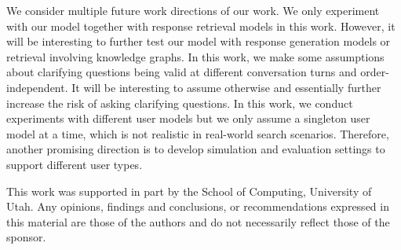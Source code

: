 \documentclass[format=acmsmall, review=False, screen=true]{acmart}
\begin{document}
We consider multiple future work directions of our work. We only experiment with our model together with response retrieval models in this work. However, it will be interesting to further test our model with response generation models or retrieval involving knowledge graphs. In this work, we make some assumptions about clarifying questions being valid at different conversation turns and order-independent. It will be interesting to assume otherwise and essentially further increase the risk of asking clarifying questions. In this work, we conduct experiments with different user models but we only assume a singleton user model at a time, which is not realistic in real-world search scenarios. Therefore, another promising direction is to develop simulation and evaluation settings to support different user types.

\begin{acks}
This work was supported in part by the School of Computing, University of Utah. Any opinions, findings and conclusions, or recommendations expressed in this material are those of the authors and do not necessarily reflect those of the sponsor.
\end{acks}




\end{document}
